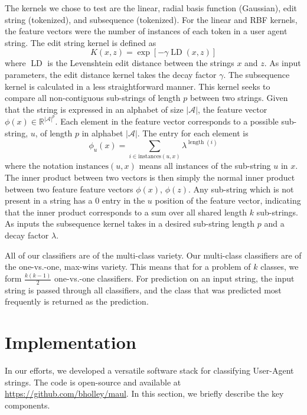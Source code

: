 \documentclass[10pt]{article}
\begin{document}
\begin{multicols}{2}
The kernels we chose to test are the linear, radial basis function (Gaussian), edit string (tokenized), and subsequence (tokenized).  For the linear and RBF kernels, the feature vectors were the number of instances of each token in a user agent string.  The edit string kernel is defined as
\begin{equation}
K(x,z) = \exp \left[ - \gamma \operatorname{LD}(x,z) \right]
\end{equation}
where $\operatorname{LD}$ is the Levenshtein edit distance between the strings $x$ and $z$.  As input parameters, the edit distance kernel takes the decay factor $\gamma$.  The subsequence kernel is calculated in a less straightforward manner.  This kernel seeks to compare all non-contiguous sub-strings of length $p$ between two strings.\cite{subseqkernel}  Given that the string is expressed in an alphabet of size $|\mathcal{A}|$, the feature vector $\phi(x) \in \mathbb{R}^{|\mathcal{A}|^p}$.  Each element in the feature vector corresponds to a possible sub-string, $u$, of length $p$ in alphabet $|\mathcal{A}|$.  The entry for each element is 
\begin{equation}\phi_u(x) = \sum_{i \in \text{instances}(u,x)} \lambda^{\operatorname{length}(i)}
\end{equation}
where the notation $ \text{instances}(u,x)$ means all instances of the sub-string $u$ in $x$.  The inner product between two vectors is then simply  the normal inner product between two feature feature vectors $\phi(x)$, $\phi(z)$.  Any sub-string which is not present in a string has a $0$ entry in the $u$ position of the feature vector, indicating that the inner product corresponds to a sum over all shared length $k$ sub-strings.  As inputs the subsequence kernel takes in a desired sub-string length $p$ and a decay factor $\lambda$.

All of our classifiers are of the multi-class variety.  Our multi-class classifiers are of the one-vs.-one, max-wins variety.  This means that for a problem of $k$ classes, we form $\frac{k(k-1)}{2}$ one-vs.-one classifiers.  For prediction on an input string, the input string is passed through all classifiers, and the class that was predicted most frequently is returned as the prediction.  

\section{Implementation}

In our efforts, we developed a  versatile software stack for classifying User-Agent strings. The code is open-source and available at \url{https://github.com/bholley/maul}. In this section, we briefly describe the key components.



\end{multicols}
\end{document}
